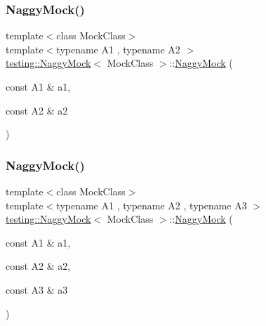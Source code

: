 \mbox{\label{classtesting_1_1_naggy_mock_a4241363ab2ca3a2e7baa5ead980175e6}} 
\subsubsection{\texorpdfstring{NaggyMock()}{NaggyMock()}\hspace{0.1cm}{\footnotesize\ttfamily [9/17]}}
{\footnotesize\ttfamily template$<$class Mock\+Class$>$ \\
template$<$typename A1 , typename A2 $>$ \\
\mbox{\hyperlink{classtesting_1_1_naggy_mock}{testing\+::\+Naggy\+Mock}}$<$ Mock\+Class $>$\+::\mbox{\hyperlink{classtesting_1_1_naggy_mock}{Naggy\+Mock}} (\begin{DoxyParamCaption}\item[{const A1 \&}]{a1,  }\item[{const A2 \&}]{a2 }\end{DoxyParamCaption})\hspace{0.3cm}{\ttfamily [inline]}}

\mbox{\label{classtesting_1_1_naggy_mock_abd9eea0573bf39f4b41504b2d1df5311}} 
\subsubsection{\texorpdfstring{NaggyMock()}{NaggyMock()}\hspace{0.1cm}{\footnotesize\ttfamily [10/17]}}
{\footnotesize\ttfamily template$<$class Mock\+Class$>$ \\
template$<$typename A1 , typename A2 , typename A3 $>$ \\
\mbox{\hyperlink{classtesting_1_1_naggy_mock}{testing\+::\+Naggy\+Mock}}$<$ Mock\+Class $>$\+::\mbox{\hyperlink{classtesting_1_1_naggy_mock}{Naggy\+Mock}} (\begin{DoxyParamCaption}\item[{const A1 \&}]{a1,  }\item[{const A2 \&}]{a2,  }\item[{const A3 \&}]{a3 }\end{DoxyParamCaption})\hspace{0.3cm}{\ttfamily [inline]}}

